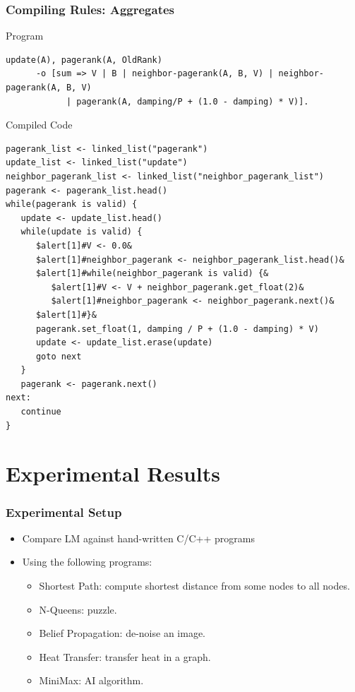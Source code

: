 \documentclass{beamer}
\begin{document}
\begin{frame}[fragile]
   \frametitle{Compiling Rules: Aggregates}
     \begin{block}{Program}
\begin{Verbatim}[fontsize=\tiny,commandchars=\\\{\},frame=single]
update(A), pagerank(A, OldRank)
      -o [sum => V | B | neighbor-pagerank(A, B, V) | neighbor-pagerank(A, B, V)
            | pagerank(A, damping/P + (1.0 - damping) * V)].
\end{Verbatim}
\end{block}
   \begin{block}{Compiled Code}
\begin{Verbatim}[fontsize=\tiny,frame=single,commandchars=\$\#\&]
pagerank_list <- linked_list("pagerank")
update_list <- linked_list("update")
neighbor_pagerank_list <- linked_list("neighbor_pagerank_list")
pagerank <- pagerank_list.head()
while(pagerank is valid) {
   update <- update_list.head()
   while(update is valid) {
      $alert[1]#V <- 0.0&
      $alert[1]#neighbor_pagerank <- neighbor_pagerank_list.head()&
      $alert[1]#while(neighbor_pagerank is valid) {&
         $alert[1]#V <- V + neighbor_pagerank.get_float(2)&
         $alert[1]#neighbor_pagerank <- neighbor_pagerank.next()&
      $alert[1]#}&
      pagerank.set_float(1, damping / P + (1.0 - damping) * V)
      update <- update_list.erase(update)
      goto next
   }
   pagerank <- pagerank.next()
next:
   continue
}
\end{Verbatim}
   \end{block}
\end{frame}
\section{Experimental Results}

\begin{frame}
   \frametitle{Experimental Setup}
   \begin{itemize}
      \item Compare LM against hand-written C/C++ programs
      \item Using the following programs:
      \begin{itemize}
         \item Shortest Path: compute shortest distance from some nodes to all nodes.
         \item N-Queens: puzzle.
         \item Belief Propagation: de-noise an image.
         \item Heat Transfer: transfer heat in a graph.
         \item MiniMax: AI algorithm.
      \end{itemize}
   \end{itemize}
\end{frame}
\end{document}
